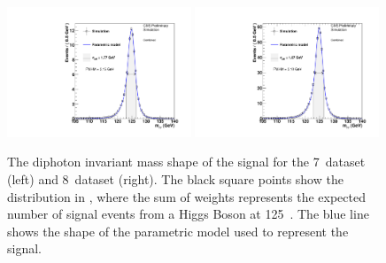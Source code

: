 \begin{figure}
  \begin{center}
    \includegraphics[width=0.49\textwidth]{analysis/plots/thesis_signal_7TeV/all.pdf}
    \includegraphics[width=0.49\textwidth]{analysis/plots/thesis_signal_8TeV/all.pdf}
    \caption{The diphoton invariant mass shape of the \SM signal for the 7~\TeV dataset (left) and 8~\TeV dataset (right). The black square points show the distribution in \MC, where the sum of weights represents the expected number of signal events from a \SM Higgs Boson at 125~\GeV. The blue line shows the shape of the parametric model used to represent the signal.}
    \label{fig:sig_shape}
  \end{center}
\end{figure}


  
